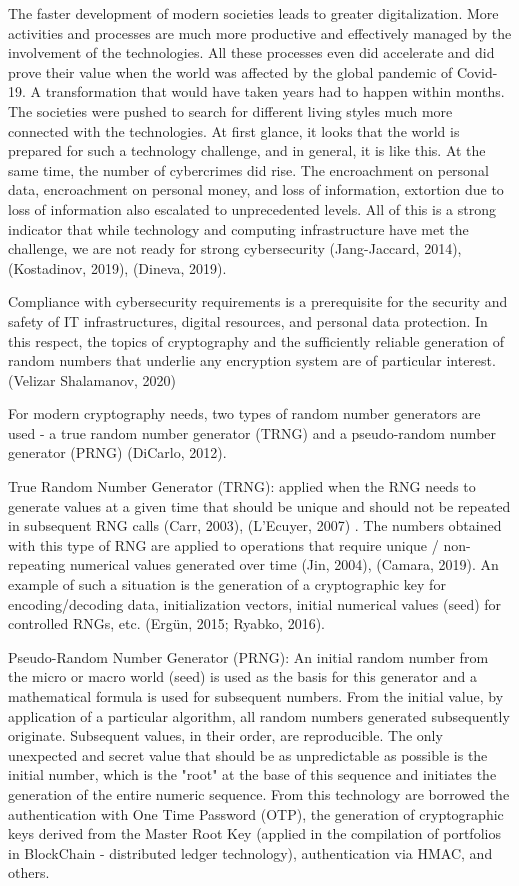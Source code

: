 \documentclass[graybox]{svmult}
\begin{document}
The faster development of modern societies leads to greater digitalization. More activities and processes are much more productive and effectively managed by the involvement of the technologies. All these processes even did accelerate and did prove their value when the world was affected by the global pandemic of Covid-19. A transformation that would have taken years had to happen within months. The societies were pushed to search for different living styles much more connected with the technologies. At first glance, it looks that the world is prepared for such a technology challenge, and in general, it is like this. At the same time, the number of cybercrimes did rise. The encroachment on personal data, encroachment on personal money, and loss of information, extortion due to loss of information also escalated to unprecedented levels. All of this is a strong indicator that while technology and computing infrastructure have met the challenge, we are not ready for strong cybersecurity (Jang-Jaccard, 2014), (Kostadinov, 2019), (Dineva, 2019).  

Compliance with cybersecurity requirements is a prerequisite for the security and safety of IT infrastructures, digital resources, and personal data protection. In this respect, the topics of cryptography and the sufficiently reliable generation of random numbers that underlie any encryption system are of particular interest. (Velizar Shalamanov, 2020)

For modern cryptography needs, two types of random number generators are used - a true random number generator (TRNG) and a pseudo-random number generator (PRNG) (DiCarlo, 2012). 

True Random Number Generator (TRNG): applied when the RNG needs to generate values at a given time that should be unique and should not be repeated in subsequent RNG calls (Carr, 2003), (L'Ecuyer, 2007) . The numbers obtained with this type of RNG are applied to operations that require unique / non-repeating numerical values generated over time (Jin, 2004), (Camara, 2019). An example of such a situation is the generation of a cryptographic key for encoding/decoding data, initialization vectors, initial numerical values (seed) for controlled RNGs, etc. (Ergün, 2015; Ryabko, 2016). 

Pseudo-Random Number Generator (PRNG): An initial random number from the micro or macro world (seed) is used as the basis for this generator and a mathematical formula is used for subsequent numbers. From the initial value, by application of a particular algorithm, all random numbers generated subsequently originate. Subsequent values, in their order, are reproducible. The only unexpected and secret value that should be as unpredictable as possible is the initial number, which is the "root" at the base of this sequence and initiates the generation of the entire numeric sequence. From this technology are borrowed the authentication with One Time Password (OTP), the generation of cryptographic keys derived from the Master Root Key (applied in the compilation of portfolios in BlockChain - distributed ledger technology), authentication via HMAC, and others.
\end{document}
